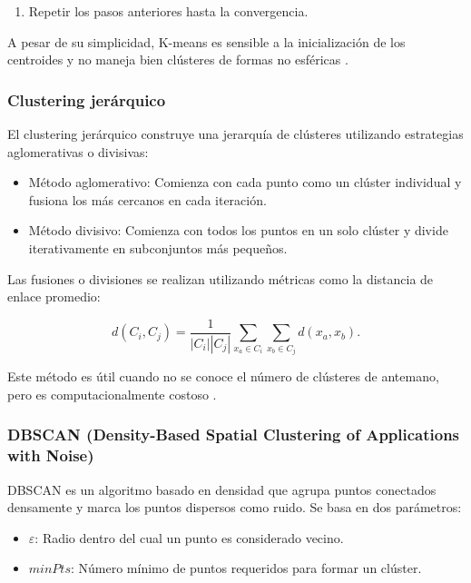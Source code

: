 \begin{itemize}
\begin{enumerate}
			\item Repetir los pasos anteriores hasta la convergencia.
		\end{enumerate}
		
		A pesar de su simplicidad, K-means es sensible a la inicialización de los centroides y no maneja bien clústeres de formas no esféricas \cite{macqueen1967some}.
		
		\subsubsection{Clustering jerárquico}
		
		El clustering jerárquico construye una jerarquía de clústeres utilizando estrategias aglomerativas o divisivas:
		
		\begin{itemize}
			\item Método aglomerativo: Comienza con cada punto como un clúster individual y fusiona los más cercanos en cada iteración.
			\item Método divisivo: Comienza con todos los puntos en un solo clúster y divide iterativamente en subconjuntos más pequeños.
		\end{itemize}
		
		Las fusiones o divisiones se realizan utilizando métricas como la distancia de enlace promedio:
		
		\begin{equation}
			d(C_i, C_j) = \frac{1}{|C_i| |C_j|} \sum_{x_a \in C_i} \sum_{x_b \in C_j} d(x_a, x_b).
		\end{equation}
		
		Este método es útil cuando no se conoce el número de clústeres de antemano, pero es computacionalmente costoso \cite{kaufman2009finding}.
		
		\subsubsection{DBSCAN (Density-Based Spatial Clustering of Applications with Noise)}
		
		DBSCAN es un algoritmo basado en densidad que agrupa puntos conectados densamente y marca los puntos dispersos como ruido. Se basa en dos parámetros:
		
		\begin{itemize}
			\item \( \varepsilon \): Radio dentro del cual un punto es considerado vecino.
			\item \( minPts \): Número mínimo de puntos requeridos para formar un clúster.
		\end{itemize}
		

\end{itemize}
